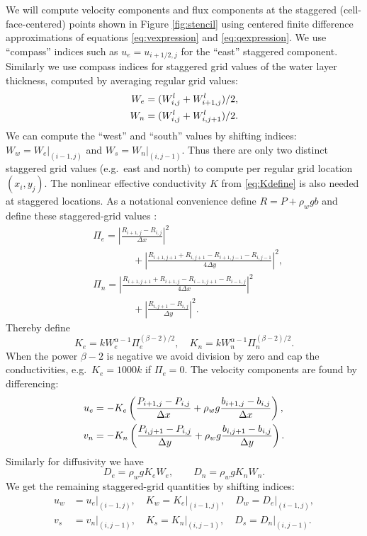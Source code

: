 \documentclass[gmd]{copernicus}   %
\begin{document}
We will compute velocity components and flux components at the staggered (cell-face-centered) points shown in Figure \ref{fig:stencil} using centered finite difference approximations of equations \eqref{eq:vexpression} and \eqref{eq:qexpression}.  We use ``compass'' indices such as $u_e = u_{i+1/2,j}$ for the ``east'' staggered component.  Similarly we use compass indices for staggered grid values of the water layer thickness, computed by averaging regular grid values:
\begin{align}
W_e &= (W_{i,j}^l + W_{i+1,j}^l)/2, \label{eq:stagW} \\
W_n &= (W_{i,j}^l + W_{i,j+1}^l)/2. \notag
\end{align}
We can compute the ``west'' and ``south'' values by shifting indices: $W_w = W_e\big|_{(i-1,j)}$ and $W_s = W_n\big|_{(i,j-1)}$.  Thus there are only two distinct staggered grid values (e.g.~east and north) to compute per regular grid location $(x_i,y_j)$.
The nonlinear effective conductivity $K$ from \eqref{eq:Kdefine} is also needed at staggered locations.  As a notational convenience define $R=P+\rho_w g b$ and define these staggered-grid values \citep[compare][]{Mahaffy}:
\begin{align*}
&\Pi_e = \left|\frac{R_{i+1,j}-R_{i,j}}{\Delta x}\right|^2 \\
&\qquad \qquad + \left|\frac{R_{i+1,j+1}+R_{i,j+1} - R_{i+1,j-1}-R_{i,j-1}}{4\Delta y}\right|^2, \\
&\Pi_n = \left|\frac{R_{i+1,j+1}+R_{i+1,j} - R_{i-1,j+1}-R_{i-1,j}}{4\Delta x}\right|^2 \\
&\qquad \qquad + \left|\frac{R_{i,j+1}-R_{i,j}}{\Delta y}\right|^2.
\end{align*}
Thereby define
\begin{equation}
K_e = k W_e^{\alpha-1} \Pi_e^{(\beta-2)/2}, \quad K_n = k W_n^{\alpha-1} \Pi_n^{(\beta-2)/2}.  \label{eq:stagK}
\end{equation}
When the power $\beta-2$ is negative we avoid division by zero and cap the conductivities, e.g.~$K_e = 1000 k$ if $\Pi_e = 0$.  The velocity components are found by differencing:
\begin{align}
u_e &= - K_e \left(\frac{P_{i+1,j}-P_{i,j}}{\Delta x} + \rho_w g \frac{b_{i+1,j}-b_{i,j}}{\Delta x}\right),  \label{eq:velocitycomp} \\
v_n &= - K_n \left(\frac{P_{i,j+1}-P_{i,j}}{\Delta y} + \rho_w g \frac{b_{i,j+1}-b_{i,j}}{\Delta y}\right). \notag
\end{align}
Similarly for diffusivity we have
\begin{equation}
D_e = \rho_w g K_e W_e, \qquad D_n = \rho_w g K_n W_n.  \label{eq:diffusivitycomp}
\end{equation}
We get the remaining staggered-grid quantities by shifting indices:
\begin{align*}
u_w &= u_e\big|_{(i-1,j)}, \quad K_w = K_e\big|_{(i-1,j)}, \quad D_w = D_e\big|_{(i-1,j)}, \\
v_s &= v_n\big|_{(i,j-1)}, \quad K_s = K_n\big|_{(i,j-1)}, \quad D_s = D_n\big|_{(i,j-1)}.
\end{align*}
\end{document}
